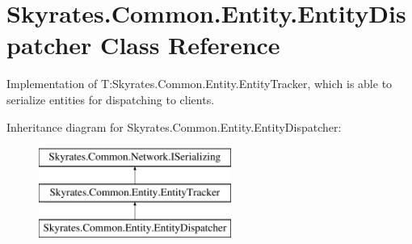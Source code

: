 \hypertarget{class_skyrates_1_1_common_1_1_entity_1_1_entity_dispatcher}{\section{Skyrates.\-Common.\-Entity.\-Entity\-Dispatcher Class Reference}
\label{class_skyrates_1_1_common_1_1_entity_1_1_entity_dispatcher}
}


Implementation of T\-:\-Skyrates.\-Common.\-Entity.\-Entity\-Tracker, which is able to serialize entities for dispatching to clients.  


Inheritance diagram for Skyrates.\-Common.\-Entity.\-Entity\-Dispatcher\-:\begin{figure}[H]
\begin{center}
\leavevmode
\includegraphics[height=3.000000cm]{class_skyrates_1_1_common_1_1_entity_1_1_entity_dispatcher}
\end{center}
\end{figure}
